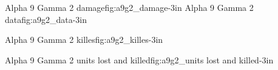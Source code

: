 
			{Alpha 9 Gamma 2 damage}{fig:a9g2_damage}{-3in}		
			\newpage			
{}
			{Alpha 9 Gamma 2 data}{fig:a9g2_data}{-3in}		
			\newpage

			{Alpha 9 Gamma 2 killes}{fig:a9g2_killes}{-3in}
			\newpage

			{Alpha 9 Gamma 2 units lost and killed}{fig:a9g2_units lost and killed}{-3in}

			\newpage